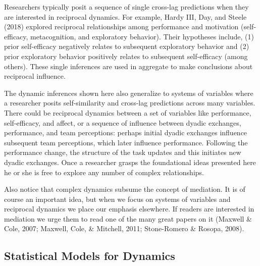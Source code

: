 \documentclass[english,,man]{apa6}
\theoremstyle{definition}
\theoremstyle{definition}
\theoremstyle{definition}
\theoremstyle{remark}
\begin{document}
Researchers typically posit a sequence of single cross-lag predictions
when they are interested in reciprocal dynamics. For example, Hardy III,
Day, and Steele (2018) explored reciprocal relationships among
performance and motivation (self-efficacy, metacognition, and
exploratory behavior). Their hypotheses include, (1) prior self-efficacy
negatively relates to subsequent exploratory behavior and (2) prior
exploratory behavior positively relates to subsequent self-efficacy
(among others). These single inferences are used in aggregate to make
conclusions about reciprocal influence.

The dynamic inferences shown here also generalize to systems of
variables where a researcher posits self-similarity and cross-lag
predictions across many variables. There could be reciprocal dynamics
between a set of variables like performance, self-efficacy, and affect,
or a sequence of influence between dyadic exchanges, performance, and
team perceptions: perhaps initial dyadic exchanges influence subsequent
team perceptions, which later influence performance. Following the
performance change, the structure of the task updates and this initiates
new dyadic exchanges. Once a researcher grasps the foundational ideas
presented here he or she is free to explore any number of complex
relationships.

Also notice that complex dynamics subsume the concept of mediation. It
is of course an important idea, but when we focus on systems of
variables and reciprocal dynamics we place our emphasis elsewhere. If
readers are interested in mediation we urge them to read one of the many
great papers on it (Maxwell \& Cole, 2007; Maxwell, Cole, \& Mitchell,
2011; Stone-Romero \& Rosopa, 2008).

\hypertarget{statistical-models-for-dynamics}{%
\subsection{Statistical Models for
Dynamics}\label{statistical-models-for-dynamics}}
\end{document}
